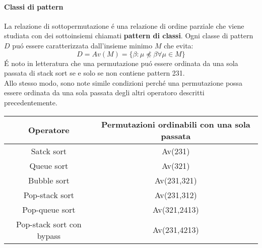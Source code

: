 \paragraph*{Classi di pattern} La relazione di sottopermutazione \'e una relazione di ordine parziale che viene studiata con dei sottoinsiemi chiamati \textbf{pattern di classi}. Ogni classe di pattern $D$ pu\'o essere caratterizzata dall'insieme minimo $M$ che evita:$$ D = Av(M) = \{\beta:\mu\not\preceq\beta\forall\mu\in M\}$$
\'E noto in letteratura \cite{limbrief} che una permutazione pu\'o essere ordinata da una sola passata di stack sort se e solo se non contiene pattern 231.\\
Allo stesso modo, sono note simile condizioni perch\'e una permutazione possa essere ordinata da una sola passata degli altri operatoro descritti precedentemente.
\begin{center}
\begin{tabular}{ |c|c| } 
\hline
\textbf{Operatore} & \textbf{Permutazioni ordinabili con una sola passata} \\ 
\hline
Satck sort & Av(231)\\ 
Queue sort & Av(321)\\ 
Bubble sort & Av(231,321)\\ 
Pop-stack sort & Av(231,312)\\ 
Pop-queue sort& Av(321,2413)\\ 
Pop-stack sort con bypass &Av(231,4213)\\ 
\hline
\end{tabular}
\end{center}
